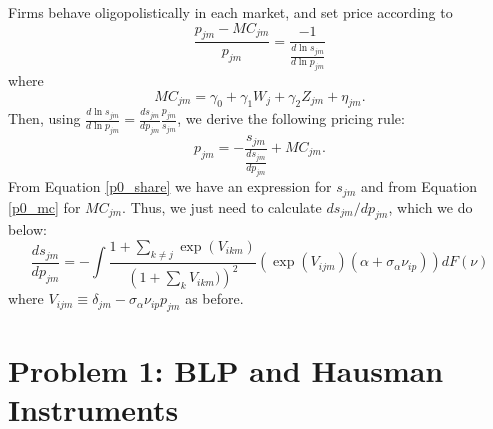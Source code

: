\documentclass{article}
\begin{document}
\begin{answer}
Firms behave oligopolistically in each market, and set price according to 
\begin{equation}
    \frac{p_{jm} - MC_{jm}}{p_{jm}} = \frac{-1}{\frac{d \ln s_{jm}}{d \ln p_{jm}}}
\end{equation}
where 
\begin{equation}\label{p0_mc}
    MC_{jm} = \gamma_0 + \gamma_1 W_j + \gamma_2 Z_{jm} + \eta_{jm}.
\end{equation}
Then, using $\frac{d \ln s_{jm}}{d \ln p_{jm}} = \frac{d s_{jm}}{d p_{jm}} \frac{p_{jm}}{s_{jm}}$, we derive the following pricing rule: 
\begin{equation}\label{po_pricing}
    p_{jm} = - \frac{s_{jm}}{\frac{d s_{jm}}{d p_{jm}} } +  MC_{jm}.
\end{equation}
From Equation \ref{p0_share} we have an expression for $s_{jm}$ and from Equation \ref{p0_mc} for $MC_{jm}$. Thus, we just need to calculate $d s_{jm} / d p_{jm}$, which we do below: 
\begin{equation}\label{p0_share_own_deriv}
    \frac{d s_{jm}}{d p_{jm}} = -\int \frac{1 + \sum_{k \neq j} \exp(V_{ikm})}{\left(1 + \sum_{k} V_{ikm})\right)^2} \left(\exp(V_{ijm}) (\alpha + \sigma_\alpha \nu_{ip})\right) d F(\nu)
\end{equation}
where $V_{ijm} \equiv \delta_{jm} - \sigma_\alpha \nu_{ip} p_{jm}$ as before. 

\end{answer}

\section*{Problem 1: BLP and Hausman Instruments}
\end{document}
